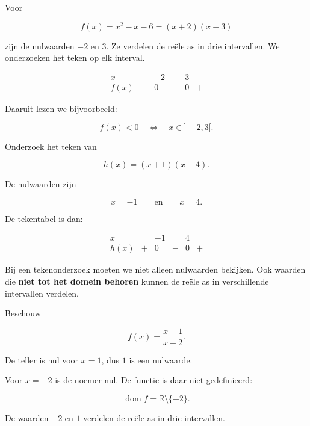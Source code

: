 \documentclass{ximera}
\begin{document}
Voor

\[
f(x)=x^2-x-6=(x+2)(x-3)
\]

zijn de nulwaarden \(-2\) en \(3\).
Ze verdelen de reële as in drie intervallen. We onderzoeken het teken op elk interval.

\[
\begin{array}{c|ccccc}
x &  & -2 &  & 3 & \\
\hline
f(x) & + & 0 & - & 0 & +
\end{array}
\]

Daaruit lezen we bijvoorbeeld:

\[
f(x)<0
\quad\Longleftrightarrow\quad
x\in]-2,3[.
\]

\begin{voorbeeld}

Onderzoek het teken van

\[
h(x)=(x+1)(x-4).
\]

De nulwaarden zijn

\[
x=-1
\qquad\text{en}\qquad
x=4.
\]

De tekentabel is dan:

\[
\begin{array}{c|ccccc}
x & & -1 &  & 4 & \\

\hline
h(x) & + & 0 & - & 0 & +
\end{array}
\]


\end{voorbeeld}




Bij een tekenonderzoek moeten we niet alleen nulwaarden bekijken.
Ook waarden die \textbf{niet tot het domein behoren} kunnen de reële as
in verschillende intervallen verdelen.

Beschouw

\[
f(x)=\frac{x-1}{x+2}.
\]

De teller is nul voor \(x=1\), dus \(1\) is een nulwaarde.

Voor \(x=-2\) is de noemer nul. De functie is daar niet gedefinieerd:

\[
\operatorname{dom}f=\mathbb{R}\setminus\{-2\}.
\]

De waarden \(-2\) en \(1\) verdelen de reële as in drie intervallen.
\end{document}
